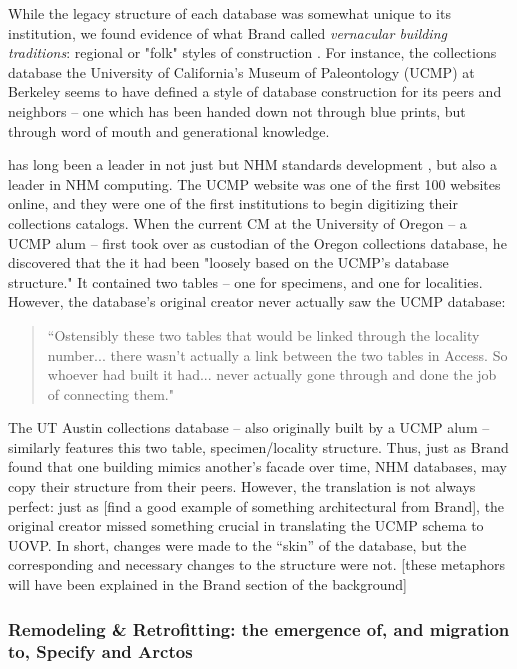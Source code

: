 While the legacy structure of each database was somewhat unique to its institution, we found evidence of what Brand called \textit{vernacular building traditions}: regional or "folk" styles of construction \cite{brand1995buildings}. For instance, the collections database the University of California’s Museum of Paleontology (UCMP) at Berkeley seems to have defined a style of database construction for its peers and neighbors -- one which has been handed down not through blue prints, but through word of mouth and generational knowledge.   

has long been a leader in not just but NHM standards development \cite{Star_1989}, but also a leader in NHM computing. The UCMP website was one of the first 100 websites online, and they were one of the first institutions to begin digitizing their collections catalogs. When the current CM at the University of Oregon -- a UCMP alum -- first took over as custodian of the Oregon collections database, he discovered that the it had been "loosely based on the UCMP's database structure." It contained two tables -- one for specimens, and one for localities. However, the database’s original creator never actually saw the UCMP database:
\begin{quote}
“Ostensibly these two tables that would be linked through the locality number... there wasn't actually a link between the two tables in Access. So whoever had built it had... never actually gone through and done the job of connecting them."
\end{quote}
The UT Austin collections database – also originally built by a UCMP alum – similarly features this two table, specimen/locality structure. Thus, just as Brand found that one building mimics another’s facade over time, NHM databases, may copy their structure from their peers. However, the translation is not always perfect: just as [find a good example of something architectural from Brand], the original creator missed something crucial in translating the UCMP schema to UOVP. In short, changes were made to the “skin” of the database, but the corresponding and necessary changes to the structure were not. [these metaphors will have been explained in the Brand section of the background] 

\subsubsection{Remodeling \& Retrofitting: the emergence of, and migration to, Specify and Arctos}

